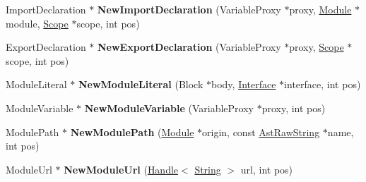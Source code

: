 \begin{DoxyCompactItemize}
\item 
\hypertarget{classv8_1_1internal_1_1_b_a_s_e___e_m_b_e_d_d_e_d_ab585dc550e5e501727b1307e472b2406}{}Import\+Declaration $\ast$ {\bfseries New\+Import\+Declaration} (Variable\+Proxy $\ast$proxy, \hyperlink{classv8_1_1internal_1_1_module}{Module} $\ast$module, \hyperlink{classv8_1_1internal_1_1_scope}{Scope} $\ast$scope, int pos)\label{classv8_1_1internal_1_1_b_a_s_e___e_m_b_e_d_d_e_d_ab585dc550e5e501727b1307e472b2406}

\item 
\hypertarget{classv8_1_1internal_1_1_b_a_s_e___e_m_b_e_d_d_e_d_a85abf50c096757e46357df03a163d2e8}{}Export\+Declaration $\ast$ {\bfseries New\+Export\+Declaration} (Variable\+Proxy $\ast$proxy, \hyperlink{classv8_1_1internal_1_1_scope}{Scope} $\ast$scope, int pos)\label{classv8_1_1internal_1_1_b_a_s_e___e_m_b_e_d_d_e_d_a85abf50c096757e46357df03a163d2e8}

\item 
\hypertarget{classv8_1_1internal_1_1_b_a_s_e___e_m_b_e_d_d_e_d_a9282644ad8078de75b8a0bbe4506925c}{}Module\+Literal $\ast$ {\bfseries New\+Module\+Literal} (Block $\ast$body, \hyperlink{classv8_1_1internal_1_1_interface}{Interface} $\ast$interface, int pos)\label{classv8_1_1internal_1_1_b_a_s_e___e_m_b_e_d_d_e_d_a9282644ad8078de75b8a0bbe4506925c}

\item 
\hypertarget{classv8_1_1internal_1_1_b_a_s_e___e_m_b_e_d_d_e_d_a2349e48573a4d6991ad8c5c226d3040e}{}Module\+Variable $\ast$ {\bfseries New\+Module\+Variable} (Variable\+Proxy $\ast$proxy, int pos)\label{classv8_1_1internal_1_1_b_a_s_e___e_m_b_e_d_d_e_d_a2349e48573a4d6991ad8c5c226d3040e}

\item 
\hypertarget{classv8_1_1internal_1_1_b_a_s_e___e_m_b_e_d_d_e_d_ab8d81bcff95e8b1748aabf2bc3d9178c}{}Module\+Path $\ast$ {\bfseries New\+Module\+Path} (\hyperlink{classv8_1_1internal_1_1_module}{Module} $\ast$origin, const \hyperlink{classv8_1_1internal_1_1_ast_raw_string}{Ast\+Raw\+String} $\ast$name, int pos)\label{classv8_1_1internal_1_1_b_a_s_e___e_m_b_e_d_d_e_d_ab8d81bcff95e8b1748aabf2bc3d9178c}

\item 
\hypertarget{classv8_1_1internal_1_1_b_a_s_e___e_m_b_e_d_d_e_d_a041a7e4362d638d757daa2123e39a2c8}{}Module\+Url $\ast$ {\bfseries New\+Module\+Url} (\hyperlink{classv8_1_1internal_1_1_handle}{Handle}$<$ \hyperlink{classv8_1_1internal_1_1_string}{String} $>$ url, int pos)\label{classv8_1_1internal_1_1_b_a_s_e___e_m_b_e_d_d_e_d_a041a7e4362d638d757daa2123e39a2c8}


\end{DoxyCompactItemize}

